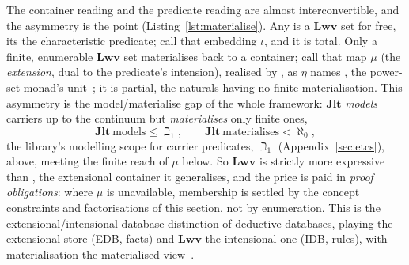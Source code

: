 \documentclass[11pt, a4paper]{article}
\begin{document}
The container reading and the predicate reading are almost interconvertible, and the asymmetry is the point (Listing~\ref{lst:materialise}).
Any  is a $\mathbf{Lwv}$ set for free, its  the characteristic predicate; call that embedding $\iota$, and it is total.
Only a finite, enumerable $\mathbf{Lwv}$ set materialises back to a container; call that map $\mu$ (the \emph{extension}, dual to the predicate's intension), realised by , as $\eta$ names , the power-set monad's unit~\cite{moggi1991notions}; it is partial, the naturals having no finite materialisation.
This asymmetry is the model/materialise gap of the whole framework: $\mathbf{Jlt}$ \emph{models} carriers up to the continuum but \emph{materialises} only finite ones,
\begin{equation}
\label{eqn:model-materialise}
  \mathbf{Jlt}\ \text{models} \le \beth_1, \qquad \mathbf{Jlt}\ \text{materialises} < \aleph_0 ,
\end{equation}
the library's modelling scope for carrier predicates, $\beth_1$ (Appendix~\ref{sec:etcs}), above, meeting the finite reach of $\mu$ below.
So $\mathbf{Lwv}$ is strictly more expressive than , the extensional container it generalises, and the price is paid in \emph{proof obligations}: where $\mu$ is unavailable, membership is settled by the concept constraints and factorisations of this section, not by enumeration.
This is the extensional/intensional database distinction of deductive databases,  playing the extensional store (EDB, facts) and $\mathbf{Lwv}$ the intensional one (IDB, rules), with materialisation the materialised view~\cite{abiteboul1995foundations}.
\end{document}
